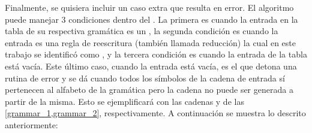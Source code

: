 Finalmente, se quisiera incluir un caso extra que resulta en error. El algoritmo puede manejar 3 condiciones dentro del . La primera es cuando la entrada en la tabla de su respectiva gramática es un , la segunda condición es cuando la entrada es una regla de reescritura (también llamada reducción) la cual en este trabajo se identificó como , y la tercera condición es cuando la entrada de la tabla está vacía. Este último caso, cuando la entrada está vacía, es el que detona una rutina de error y se dá cuando todos los símbolos de la cadena de entrada sí pertenecen al alfabeto de la gramática pero la cadena no puede ser generada a partir de la misma. Esto se ejemplificará con las cadenas  y  de las \cref{grammar_1,grammar_2}, respectivamente. A continuación se muestra lo descrito anteriormente:
